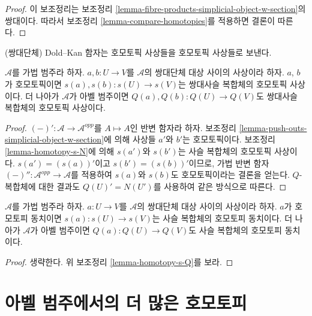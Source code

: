 \begin{proof}
이 보조정리는 보조정리
\ref{lemma-fibre-products-simplicial-object-w-section}의 쌍대이다.
따라서 보조정리 \ref{lemma-compare-homotopies}를 적용하면 결론이 따른다.
\end{proof}

\begin{lemma}
\label{lemma-homotopy-s-Q}
\begin{slogan}
(쌍대단체) Dold--Kan 함자는 호모토픽 사상들을 호모토픽 사상들로 보낸다.
\end{slogan}
$\mathcal{A}$를 가법 범주라 하자. $a, b : U \to V$를
$\mathcal{A}$의 쌍대단체 대상 사이의 사상이라 하자. $a$, $b$가
호모토픽이면 $s(a), s(b) : s(U) \to s(V)$는 쌍대사슬 복합체의
호모토픽 사상이다. 더 나아가 $\mathcal{A}$가 아벨 범주이면
$Q(a), Q(b) : Q(U) \to Q(V)$도 쌍대사슬 복합체의 호모토픽 사상이다.
\end{lemma}

\begin{proof}
$(-)' : \mathcal{A} \to \mathcal{A}^{opp}$를 $A \mapsto A$인 반변
함자라 하자.
보조정리 \ref{lemma-push-outs-simplicial-object-w-section}에 의해
사상들 $a'$와 $b'$는 호모토픽이다. 보조정리
\ref{lemma-homotopy-s-N}에 의해 $s(a')$와 $s(b')$는 사슬 복합체의
호모토픽 사상이다. $s(a') = (s(a))'$이고 $s(b') = (s(b))'$이므로,
가법 반변 함자 $(-)'' : \mathcal{A}^{opp} \to \mathcal{A}$를 적용하여
$s(a)$와 $s(b)$도 호모토픽이라는 결론을 얻는다. $Q$-복합체에 대한
결과도 $Q(U)' = N(U')$를 사용하여 같은 방식으로 따른다.
\end{proof}

\begin{lemma}
\label{lemma-homotopy-equivalence-s-Q}
$\mathcal{A}$를 가법 범주라 하자. $a : U \to V$를 $\mathcal{A}$의
쌍대단체 대상 사이의 사상이라 하자. $a$가 호모토피 동치이면
$s(a) : s(U) \to s(V)$는 사슬 복합체의 호모토피 동치이다.
더 나아가 $\mathcal{A}$가 아벨 범주이면
$Q(a) : Q(U) \to Q(V)$도 사슬 복합체의 호모토피 동치이다.
\end{lemma}

\begin{proof}
생략한다. 위 보조정리 \ref{lemma-homotopy-s-Q}를 보라.
\end{proof}




\section{아벨 범주에서의 더 많은 호모토피}
\label{section-backwards-homotopy}

